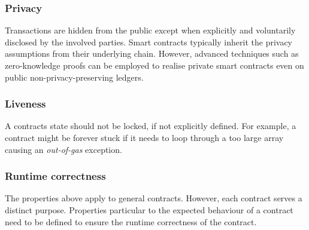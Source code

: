 \subsubsection{Privacy}
Transactions are hidden from the public except when explicitly and voluntarily disclosed by the involved parties.
Smart contracts typically inherit the privacy assumptions from their underlying chain.
However, advanced techniques such as zero-knowledge proofs can be employed to realise private smart contracts even on public non-privacy-preserving ledgers.

\subsubsection{Liveness}
A contracts state should not be locked, if not explicitly defined.
For example, a contract might be forever stuck if it needs to loop through a too large array causing an \emph{out-of-gas} exception.


\subsubsection{Runtime correctness}
The properties above apply to general contracts. However, each contract serves a distinct purpose. Properties particular to the expected behaviour of a contract need to be defined to ensure the runtime correctness of the contract.

%



